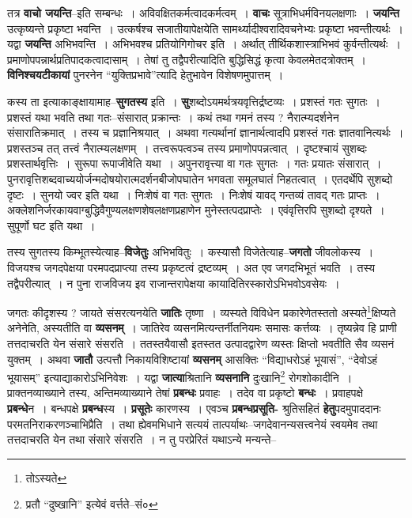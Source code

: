 \documentclass[article,12pt,a4paper]{memoir}
\begin{document}
	  \pstart तत्र \textbf{वाचो जयन्ति}--इति सम्बन्धः । अविवक्षितकर्मत्वादकर्मत्वम् । \textbf{वाचः} सूत्राभिधर्मविनयलक्षणाः । \textbf{जयन्ति} उत्कृष्यन्ते प्रकृष्टा भवन्ति । उत्कर्षश्च सजातीयापेक्षयेति सामर्थ्यादीश्वरादिवचनेभ्यः प्रकृष्टा भवन्तीत्यर्थः । यद्वा \textbf{जयन्ति} अभिभवन्ति । अभिभवश्च प्रतियोगिगोचर इति । अर्थात् तीर्थिकशास्त्राभिभवं कुर्वन्तीत्यर्थः । प्रमाणोपपन्नार्थप्रतिपादकत्वादासाम् । तेषां तु तद्वैपरीत्यादिति बुद्धिसिद्धं कृत्वा केवलमेतदत्रोक्तम् । \textbf{विनिश्चयटीकायां} पुनरनेन “युक्तिप्रभावे”त्यादि हेतुभावेन विशेषणमुपात्तम् ।
	\pend
      

	  \pstart कस्य ता इत्याकाङ्क्षायामाह--\textbf{सुगतस्य} इति । \textbf{सु}शब्दोऽयमर्थत्रयवृत्तिर्द्रष्टव्यः । प्रशस्तं गतः सुगतः । प्रशस्तं यथा भवति तथा गतः--संसारात् प्रक्रान्तः । कथं तथा गमनं तस्य ? नैरात्म्यदर्शनेन संसारातिक्रमात् । तस्य च प्रज्ञानिश्रयात् । अथवा गत्यर्थानां ज्ञानार्थत्वादपि प्रशस्तं गतः ज्ञातवानित्यर्थः । प्रशस्तञ्च तत् तत्त्वं नैरात्म्यलक्षणम् । तत्त्वरूपत्वञ्च तस्य प्रमाणोपपन्नत्वात् । दृष्टश्चायं सुशब्दः प्रशस्तार्थवृत्तिः । सुरूपा रूपाजीवेति यथा । अपुनरावृत्त्या वा गतः सुगतः । गतः प्रयातः संसारात् । पुनरावृत्तिशब्दवाच्ययोर्जन्मदोषयोरात्मदर्शनबीजोपघातेन भगवता समूलघातं निहतत्वात् । एतदर्थेपि सुशब्दो दृष्टः । सुनयो ज्वर इति यथा । निःशेषं वा गतः सुगतः । निःशेषं यावद् गन्तव्यं तावद् गतः प्राप्तः । अक्लेशनिर्जरकायवाग्बुद्धिवैगुण्यलक्षणशेषलक्षणप्रहाणेन मुनेस्तत्पदप्राप्तेः । एवंवृत्तिरपि सुशब्दो दृश्यते । सुपूर्णो घट इति यथा ।
	\pend
      

	  \pstart तस्य सु\leavevmode{}गतस्य किम्भूतस्येत्याह--\textbf{विजेतुः} अभिभवितुः । कस्यासौ विजेतेत्याह--\textbf{जगतो} जीवलोकस्य । विजयश्च जगदपेक्षया परमपदप्राप्त्या तस्य प्रकृष्टत्वं द्रष्टव्यम् । अत एव जगदभिभूतं भवति । तस्य तद्वैपरीत्यात् । न पुना राजविजय इव राजान्तरापेक्षया कायादितिरस्कारोऽभिभवोऽवसेयः ।
	\pend
      

	  \pstart जगतः कीदृशस्य ? जायते संसरत्यनयेति \textbf{जातिः} तृष्णा । व्यस्यते विविधेन प्रकारेणेतस्ततो अस्यते\footnote{तोऽस्यते}क्षिप्यते अनेनेति, अस्यतीति वा \textbf{व्यसनम्} । जातिरेव व्यसनमित्यन्तर्नीतनियमः समासः कर्त्तव्यः । तृष्यन्नेव हि प्राणी तत्तदाचरति येन संसारे संसरति । ततस्तयैवासौ इतस्तत उत्पादद्वारेण व्यस्तः क्षिप्तो भवतीति सैव व्यसनं युक्तम् । अथवा \textbf{जातौ} उत्पत्तौ निकायविशिष्टायां \textbf{व्यसनम्} आसक्तिः “विद्याधरोऽहं भूयासं”, “देवोऽहं भूयासम्” इत्याद्याकारोऽभिनिवेशः । यद्वा \textbf{जात्या}श्रितानि \textbf{व्यसनानि} दुःखानि\footnote{प्रतौ “दुष्खानि” इत्येवं वर्त्तते--सं०} रोगशोकादीनि । प्राक्तनव्याख्याने तस्य, अन्तिमव्याख्याने तेषां \textbf{प्रबन्धः} प्रवाहः । तदेव वा प्रकृष्टो \textbf{बन्धः} । प्रवाहपक्षे \textbf{प्रबन्धे}न । बन्धपक्षे \textbf{प्रबन्ध}स्य । \textbf{प्रसूतेः} कारणस्य । एवञ्च \textbf{प्रबन्धप्रसूति-} श्रुतिसहितं \textbf{हेतु}पदमुपाददानः परमतनिराकरणञ्चाभिप्रैति । तथा ह्येवमभिधाने सत्ययं \leavevmode{} तात्पर्याथः--जगदेवानन्यसत्त्वनेयं स्वयमेव तथा तत्तदाचरति येन तथा संसारे संसरति । न तु परप्रेरितं यथाऽन्ये मन्यन्ते--
	\pend
      
\end{document}
